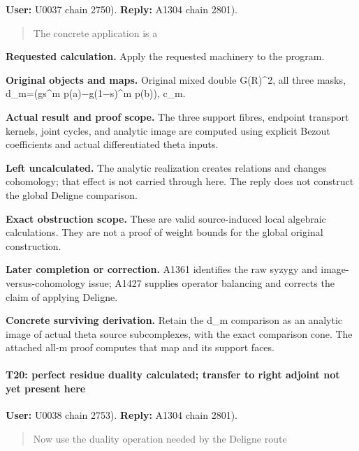 \textbf{User:} U0037
\protect{} chain 2750).
\textbf{Reply:} A1304
\protect{} chain 2801).

\begin{quote}
The concrete application is a
\end{quote}

\textbf{Requested calculation.} Apply the requested machinery to the
program.

\textbf{Original objects and maps.} Original mixed double G(R)\^{}2, all
three masks, d\_m=(gs\^{}m
p(a)\allowbreak{}\ensuremath{−}\allowbreak{}g(1\allowbreak{}\ensuremath{−}\allowbreak{}s)\textasciicircum{}m
p(b)), c\_m.

\textbf{Actual result and proof scope.} The three support fibres,
endpoint transport kernels, joint cycles, and analytic image are
computed using explicit Bezout coefficients and actual differentiated
theta inputs.

\textbf{Left uncalculated.} The analytic realization creates relations
and changes cohomology; that effect is not carried through here. The
reply does not construct the global Deligne comparison.

\textbf{Exact obstruction scope.} These are valid source-induced local
algebraic calculations. They are not a proof of weight bounds for the
global original construction.

\textbf{Later completion or correction.} A1361 identifies the raw syzygy
and image-versus-cohomology issue; A1427 supplies operator balancing and
corrects the claim of applying Deligne.

\textbf{Concrete surviving derivation.} Retain the d\_m comparison as an
analytic image of actual theta source subcomplexes, with the exact
comparison cone. The attached all-m proof computes that map and its
support faces.

\paragraph{T20: perfect residue duality calculated; transfer to right
adjoint not yet present
here}\label{t20-perfect-residue-duality-calculated-transfer-to-right-adjoint-not-yet-present-here}

\textbf{User:} U0038
\protect{} chain 2753).
\textbf{Reply:} A1304
\protect{} chain 2801).

\begin{quote}
Now use the duality operation needed by the Deligne route
\end{quote}

